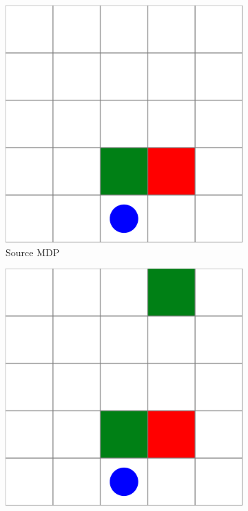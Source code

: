 \begin{figure}
    \centering
    \captionsetup[subfigure]{format=hang}
    \begin{subfigure}[t]{0.25\linewidth}
        \centering
        \includegraphics[width=\textwidth]{figures/iterative_validation/gridworld1.pdf}
        \caption{\scriptsize Source MDP}    
        \label{fig:motiation_source}
    \end{subfigure}
    \hfill
    \begin{subfigure}[t]{0.25\linewidth}  
        \centering 
        \includegraphics[width=\textwidth]{figures/iterative_validation/gridworld2.pdf}

\end{subfigure}
\end{figure}
